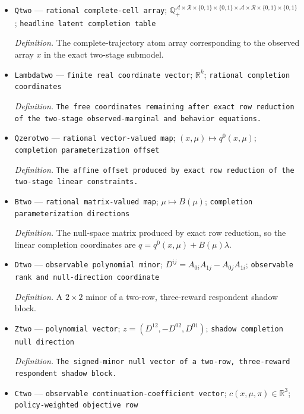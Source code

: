 \documentclass{article}
\begin{document}
\begin{itemize}
  \item \texttt{Qtwo} --- \texttt{rational complete-\allowbreak{}cell array}; \(\mathbb Q_+^{\mathcal A\times\mathcal R\times\{0,1\}\times\{0,1\}\times\mathcal A\times\mathcal R\times\{0,1\}\times\{0,1\}}\); \texttt{headline latent completion table}
  \par\smallskip\noindent\emph{Definition.} The complete-trajectory atom array corresponding to the observed array \(x\) in the exact two-stage submodel.
  \item \texttt{Lambdatwo} --- \texttt{finite real coordinate vector}; \(\mathbb R^k\); \texttt{rational completion coordinates}
  \par\smallskip\noindent\emph{Definition.} \texttt{The free coordinates remaining after exact row reduction of the two-\allowbreak{}stage observed-\allowbreak{}marginal and behavior equations.}
  \item \texttt{Qzerotwo} --- \texttt{rational vector-\allowbreak{}valued map}; \((x,\mu)\mapsto q^0(x,\mu)\); \texttt{completion parameterization offset}
  \par\smallskip\noindent\emph{Definition.} \texttt{The affine offset produced by exact row reduction of the two-\allowbreak{}stage linear constraints.}
  \item \texttt{Btwo} --- \texttt{rational matrix-\allowbreak{}valued map}; \(\mu\mapsto B(\mu)\); \texttt{completion parameterization directions}
  \par\smallskip\noindent\emph{Definition.} The null-space matrix produced by exact row reduction, so the linear completion coordinates are \(q=q^0(x,\mu)+B(\mu)\lambda\).
  \item \texttt{Dtwo} --- \texttt{observable polynomial minor}; \(D^{ij}=A_{0i}A_{1j}-A_{0j}A_{1i}\); \texttt{observable rank and null-\allowbreak{}direction coordinate}
  \par\smallskip\noindent\emph{Definition.} A \(2\times2\) minor of a two-row, three-reward respondent shadow block.
  \item \texttt{Ztwo} --- \texttt{polynomial vector}; \(z=(D^{12},-D^{02},D^{01})\); \texttt{shadow completion null direction}
  \par\smallskip\noindent\emph{Definition.} \texttt{The signed-\allowbreak{}minor null vector of a two-\allowbreak{}row,\allowbreak{} three-\allowbreak{}reward respondent shadow block.}
  \item \texttt{Ctwo} --- \texttt{observable continuation-\allowbreak{}coefficient vector}; \(c(x,\mu,\pi)\in\mathbb R^3\); \texttt{policy-\allowbreak{}weighted objective row}

\end{itemize}
\end{document}
